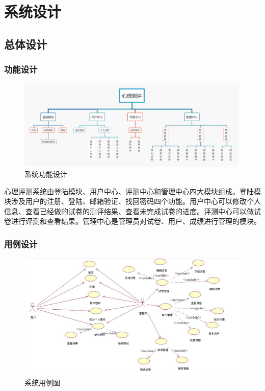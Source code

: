 \section{系统设计}

\subsection{总体设计}

\subsubsection{功能设计}

\begin{figure}[thbp!]
	\centering
	\includegraphics[width=1.0\linewidth]{figure/functions}
	\caption{系统功能设计}
	\label{fig:functions}
\end{figure}

心理评测系统由登陆模块、用户中心、评测中心和管理中心四大模块组成。登陆模块涉及用户的注册、登陆、邮箱验证、找回密码四个功能。用户中心可以修改个人信息、查看已经做的试卷的测评结果、查看未完成试卷的进度。评测中心可以做试卷进行评测和查看结果。管理中心是管理员对试卷、用户、成绩进行管理的模块。

\subsubsection{用例设计}

\begin{figure}[htp]
	\centering
	\includegraphics[width=0.8\linewidth]{figure/user_case}
	\caption{系统用例图}
	\label{fig:user_case}
\end{figure}

